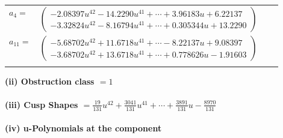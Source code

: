 \documentclass[1p]{elsarticle_modified}
\theoremstyle{definition}
\begin{document}
\begin{tabular}{m{7pt} m{180pt} m{7pt} m{180pt} }
\flushright $a_{4}=$&$\begin{pmatrix}-2.08397 u^{42}-14.2290 u^{41}+\cdots+3.96183 u+6.22137\\-3.32824 u^{42}-8.16794 u^{41}+\cdots+0.305344 u+13.2290\end{pmatrix}$ \\
\flushright $a_{11}=$&$\begin{pmatrix}-5.68702 u^{42}+11.6718 u^{41}+\cdots-8.22137 u+9.08397\\-3.68702 u^{42}+13.6718 u^{41}+\cdots+0.778626 u-1.91603\end{pmatrix}$\\&\end{tabular}
\flushleft \textbf{(ii) Obstruction class $= 1$}\\~\\
\flushleft \textbf{(iii) Cusp Shapes $= \frac{19}{131} u^{42}+\frac{3041}{131} u^{41}+\cdots+\frac{3891}{131} u-\frac{8970}{131}$}\\~\\
\newpage\renewcommand{\arraystretch}{1}
\flushleft \textbf{(iv) u-Polynomials at the component}\newline \\
\end{document}
